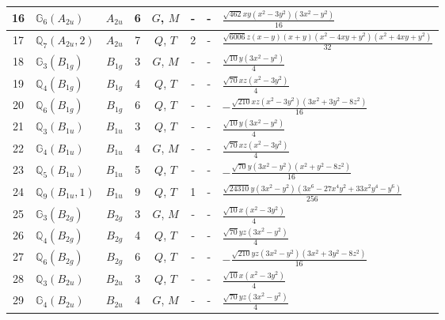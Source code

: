 \documentclass[fleqn,10pt,landscape]{jsarticle}
\begin{document}
\begin{longtable}[l]{clcccccl}
16 & $\mathbb{G}_{6}(A_{2u})$ & $A_{2u}$ & 6 & $G$, $M$ & - & - & $\frac{\sqrt{462} x y \left(x^{2} - 3 y^{2}\right) \left(3 x^{2} - y^{2}\right)}{16}$ \\ \hline
17 & $\mathbb{Q}_{7}(A_{2u},2)$ & $A_{2u}$ & 7 & $Q$, $T$ & 2 & - & $\frac{\sqrt{6006} z \left(x - y\right) \left(x + y\right) \left(x^{2} - 4 x y + y^{2}\right) \left(x^{2} + 4 x y + y^{2}\right)}{32}$ \\ \hline
18 & $\mathbb{G}_{3}(B_{1g})$ & $B_{1g}$ & 3 & $G$, $M$ & - & - & $\frac{\sqrt{10} y \left(3 x^{2} - y^{2}\right)}{4}$ \\ \hline
19 & $\mathbb{Q}_{4}(B_{1g})$ & $B_{1g}$ & 4 & $Q$, $T$ & - & - & $\frac{\sqrt{70} x z \left(x^{2} - 3 y^{2}\right)}{4}$ \\ \hline
20 & $\mathbb{Q}_{6}(B_{1g})$ & $B_{1g}$ & 6 & $Q$, $T$ & - & - & $- \frac{\sqrt{210} x z \left(x^{2} - 3 y^{2}\right) \left(3 x^{2} + 3 y^{2} - 8 z^{2}\right)}{16}$ \\ \hline
21 & $\mathbb{Q}_{3}(B_{1u})$ & $B_{1u}$ & 3 & $Q$, $T$ & - & - & $\frac{\sqrt{10} y \left(3 x^{2} - y^{2}\right)}{4}$ \\ \hline
22 & $\mathbb{G}_{4}(B_{1u})$ & $B_{1u}$ & 4 & $G$, $M$ & - & - & $\frac{\sqrt{70} x z \left(x^{2} - 3 y^{2}\right)}{4}$ \\ \hline
23 & $\mathbb{Q}_{5}(B_{1u})$ & $B_{1u}$ & 5 & $Q$, $T$ & - & - & $- \frac{\sqrt{70} y \left(3 x^{2} - y^{2}\right) \left(x^{2} + y^{2} - 8 z^{2}\right)}{16}$ \\ \hline
24 & $\mathbb{Q}_{9}(B_{1u},1)$ & $B_{1u}$ & 9 & $Q$, $T$ & 1 & - & $\frac{\sqrt{24310} y \left(3 x^{2} - y^{2}\right) \left(3 x^{6} - 27 x^{4} y^{2} + 33 x^{2} y^{4} - y^{6}\right)}{256}$ \\ \hline
25 & $\mathbb{G}_{3}(B_{2g})$ & $B_{2g}$ & 3 & $G$, $M$ & - & - & $\frac{\sqrt{10} x \left(x^{2} - 3 y^{2}\right)}{4}$ \\ \hline
26 & $\mathbb{Q}_{4}(B_{2g})$ & $B_{2g}$ & 4 & $Q$, $T$ & - & - & $\frac{\sqrt{70} y z \left(3 x^{2} - y^{2}\right)}{4}$ \\ \hline
27 & $\mathbb{Q}_{6}(B_{2g})$ & $B_{2g}$ & 6 & $Q$, $T$ & - & - & $- \frac{\sqrt{210} y z \left(3 x^{2} - y^{2}\right) \left(3 x^{2} + 3 y^{2} - 8 z^{2}\right)}{16}$ \\ \hline
28 & $\mathbb{Q}_{3}(B_{2u})$ & $B_{2u}$ & 3 & $Q$, $T$ & - & - & $\frac{\sqrt{10} x \left(x^{2} - 3 y^{2}\right)}{4}$ \\ \hline
29 & $\mathbb{G}_{4}(B_{2u})$ & $B_{2u}$ & 4 & $G$, $M$ & - & - & $\frac{\sqrt{70} y z \left(3 x^{2} - y^{2}\right)}{4}$ \\ \hline

\end{longtable}
\end{document}
